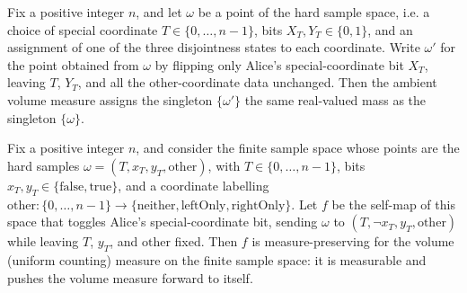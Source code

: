 \begin{theorem}
\label{CommunicationComplexity.Functions.Disjointness.RandomizedLowerBound.volume_measureReal_singleton_flipSpecialX}
\leanok
{}
Fix a positive integer $n$, and let $\omega$ be a point of the hard sample space, i.e. a
choice of special coordinate $T \in \{0,\dots,n-1\}$, bits $X_T, Y_T \in \{0,1\}$, and
an assignment of one of the three disjointness states to each coordinate. Write
$\omega'$ for the point obtained from $\omega$ by flipping only Alice's
special-coordinate bit $X_T$, leaving $T$, $Y_T$, and all the other-coordinate data
unchanged. Then the ambient volume measure assigns the singleton $\{\omega'\}$ the same
real-valued mass as the singleton $\{\omega\}$.
\end{theorem}

\begin{theorem}
\label{CommunicationComplexity.Functions.Disjointness.RandomizedLowerBound.volume_measurePreserving_flipSpecialX}
\leanok
{}
Fix a positive integer $n$, and consider the finite sample space whose points are the
hard samples $\omega = (T, x_T, y_T, \mathrm{other})$, with $T \in \{0, \dots, n-1\}$,
bits $x_T, y_T \in \{\text{false}, \text{true}\}$, and a coordinate labelling
$\mathrm{other} \colon \{0,\dots,n-1\} \to \{\text{neither}, \text{leftOnly},
\text{rightOnly}\}$. Let $f$ be the self-map of this space that toggles Alice's
special-coordinate bit, sending $\omega$ to $(T, \lnot x_T, y_T, \mathrm{other})$ while
leaving $T$, $y_T$, and $\mathrm{other}$ fixed. Then $f$ is measure-preserving for the
volume (uniform counting) measure on the finite sample space: it is measurable and
pushes the volume measure forward to itself.
\end{theorem}

